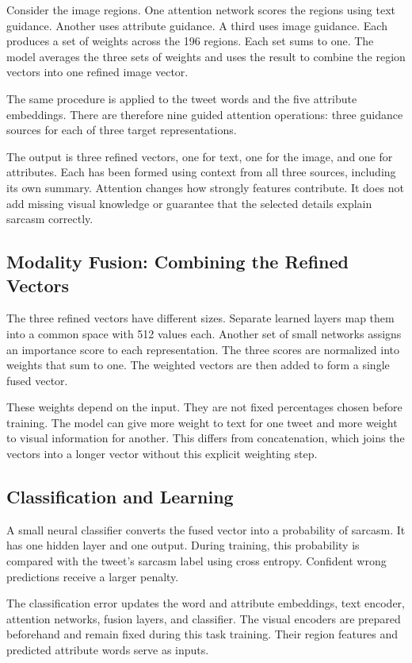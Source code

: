 \documentclass[conference]{IEEEtran}
\begin{document}
Consider the image regions. One attention network scores the regions using text guidance. Another uses attribute guidance. A third uses image guidance. Each produces a set of weights across the 196 regions. Each set sums to one. The model averages the three sets of weights and uses the result to combine the region vectors into one refined image vector.

The same procedure is applied to the tweet words and the five attribute embeddings. There are therefore nine guided attention operations: three guidance sources for each of three target representations.

The output is three refined vectors, one for text, one for the image, and one for attributes. Each has been formed using context from all three sources, including its own summary. Attention changes how strongly features contribute. It does not add missing visual knowledge or guarantee that the selected details explain sarcasm correctly.

\subsection{Modality Fusion: Combining the Refined Vectors}
The three refined vectors have different sizes. Separate learned layers map them into a common space with 512 values each. Another set of small networks assigns an importance score to each representation. The three scores are normalized into weights that sum to one. The weighted vectors are then added to form a single fused vector.

These weights depend on the input. They are not fixed percentages chosen before training. The model can give more weight to text for one tweet and more weight to visual information for another. This differs from concatenation, which joins the vectors into a longer vector without this explicit weighting step.

\subsection{Classification and Learning}
A small neural classifier converts the fused vector into a probability of sarcasm. It has one hidden layer and one output. During training, this probability is compared with the tweet's sarcasm label using cross entropy. Confident wrong predictions receive a larger penalty.

The classification error updates the word and attribute embeddings, text encoder, attention networks, fusion layers, and classifier. The visual encoders are prepared beforehand and remain fixed during this task training. Their region features and predicted attribute words serve as inputs.
\end{document}
